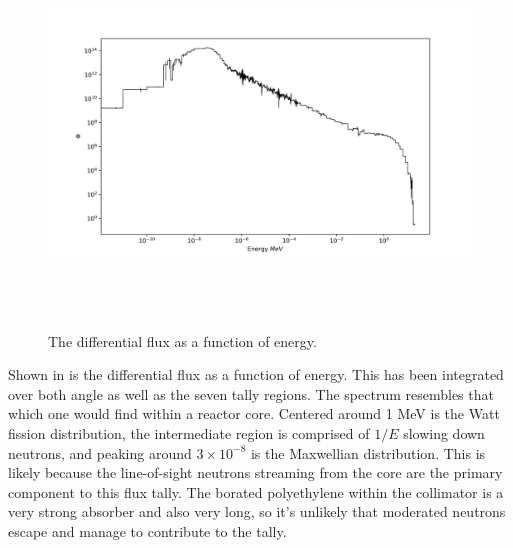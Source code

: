 \begin{figure}[htb]
\centering
\includegraphics[height=4in]{tex/figures/flux_erg.png}
\caption[Flux vs. Energy]{The differential flux as a function of energy.}
\label{fig:flux_erg}
\end{figure}

Shown in  is the differential flux as a function of energy.
This has been integrated over both angle as well as the seven tally regions.
The spectrum resembles that which one would find within a reactor core.
Centered around 1 MeV is the Watt fission distribution, the intermediate region is comprised of $1/E$ slowing down neutrons, and peaking around $3 \times 10^{-8}$ is the Maxwellian distribution.
This is likely because the line-of-sight neutrons streaming from the core are the primary component to this flux tally.
The borated polyethylene within the collimator is a very strong absorber and also very long, so it's unlikely that moderated neutrons escape and manage to contribute to the tally.

